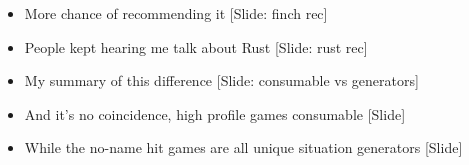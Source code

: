 \documentclass[12pt]{article}
\begin{document}
{\begin{itemize}
\item More chance of recommending it [Slide:  finch rec]

\item People kept hearing me talk about Rust [Slide:  rust rec]

\item My summary of this difference [Slide: consumable vs generators]

\item And it's no coincidence, high profile games consumable [Slide]

\item While the no-name hit games are all unique situation generators [Slide]

\end{itemize}

}
\end{document}
